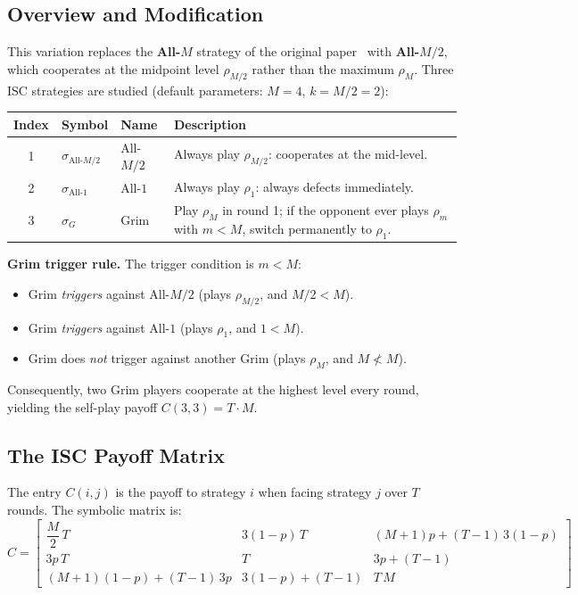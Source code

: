 \documentclass[12pt,a4paper]{article}
\begin{document}
\subsection{Overview and Modification}

This variation replaces the \textbf{All-$M$} strategy of the original
paper~\cite{LK2026} with \textbf{All-$M/2$}, which cooperates at the midpoint
level $\rho_{M/2}$ rather than the maximum $\rho_M$. Three ISC strategies are
studied (default parameters: $M=4$, $k = M/2 = 2$):

\begin{center}
\begin{tabular}{cllp{7cm}}
\toprule
Index & Symbol & Name & Description \\
\midrule
1 & $\sigma_{\text{All-}M/2}$ & All-$M/2$ &
    Always play $\rho_{M/2}$: cooperates at the mid-level. \\
2 & $\sigma_{\text{All-}1}$   & All-$1$ &
    Always play $\rho_1$: always defects immediately. \\
3 & $\sigma_G$                & Grim &
    Play $\rho_M$ in round 1; if the opponent ever plays $\rho_m$ with
    $m < M$, switch permanently to $\rho_1$. \\
\bottomrule
\end{tabular}
\end{center}

\medskip
\noindent\textbf{Grim trigger rule.} The trigger condition is $m < M$:
\begin{itemize}
  \item Grim \emph{triggers} against All-$M/2$ (plays $\rho_{M/2}$, and $M/2 < M$).
  \item Grim \emph{triggers} against All-$1$ (plays $\rho_1$, and $1 < M$).
  \item Grim does \emph{not} trigger against another Grim (plays $\rho_M$, and $M \not< M$).
\end{itemize}
Consequently, two Grim players cooperate at the highest level every round,
yielding the self-play payoff $C(3,3) = T \cdot M$.

\subsection{The ISC Payoff Matrix}

The entry $C(i,j)$ is the payoff to strategy $i$ when facing strategy $j$ over
$T$ rounds. The symbolic matrix is:
\[
C = \begin{bmatrix}
\dfrac{M}{2}\,T & 3(1-p)\,T & (M+1)p + (T-1)\,3(1-p) \\[10pt]
3p\,T & T & 3p + (T-1) \\[10pt]
(M+1)(1-p) + (T-1)\,3p & 3(1-p) + (T-1) & T\,M
\end{bmatrix}
\]
\end{document}
